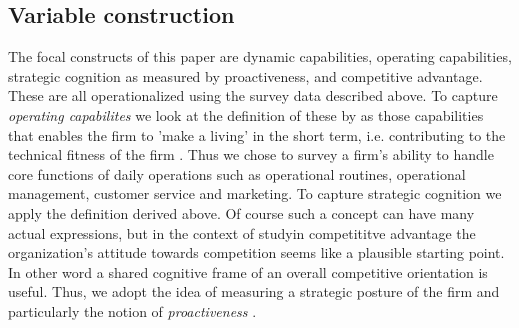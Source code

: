 \documentclass[review,fleqn]{elsarticle}\usepackage[]{graphicx}\usepackage[]{color}
\begin{document}

\subsection*{Variable construction}

The focal constructs of this paper are dynamic capabilities, operating capabilities,
strategic cognition as measured by proactiveness, and competitive advantage. These are all
operationalized using the survey data described above.  To capture \emph{operating
  capabilites} we look at the definition of these by \citep{Winter2003} as those
capabilities that enables the firm to 'make a living' in the short term, i.e. contributing
to the technical fitness of the firm \citep{Helfat2007}. Thus we chose to survey a firm's
ability to handle core functions of daily operations such as operational routines,
operational management, customer service and marketing. To capture strategic cognition we
apply the definition derived above. Of course such a concept can have many
actual expressions, but in the context of studyin competititve advantage the
organization's attitude towards competition seems like a plausible starting point. In
other word a shared cognitive frame of an overall competitive orientation is useful. Thus,
we adopt the idea of measuring a strategic posture of the firm \citep{Covin1989} and
particularly the notion of \emph{proactiveness} \citep{covin1991,Wales2016}.
\end{document}

